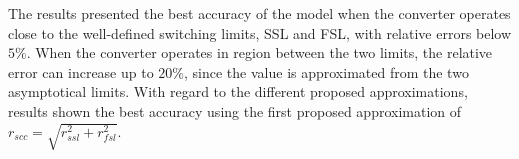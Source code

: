 The results presented the best accuracy of the model when the converter operates close to the well-defined switching limits, SSL and FSL, with relative errors below $5\%$. When the converter operates in region between the two limits, the relative error can increase up to $20\%$, since the value is approximated from the two asymptotical limits. With regard to the different proposed approximations, results shown the best accuracy using the first proposed approximation of $r_{scc} = \sqrt{r_{ssl}^2 + r_{fsl}^2}$.

\clearpage

 